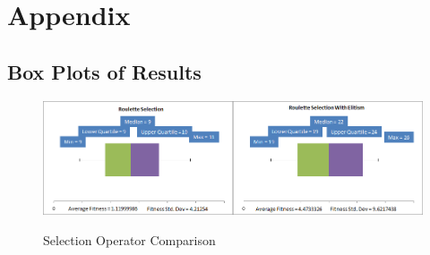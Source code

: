 \documentclass[]{report}
\begin{document}
\chapter{Appendix}

\section{Box Plots of Results}

\begin{figure}
	\centering
	\includegraphics[width=\textwidth]{figures/boxplots/selectionOperator.png}
	\label{BPselectionOperator}
	\caption{Selection Operator Comparison}
\end{figure}
\end{document}
